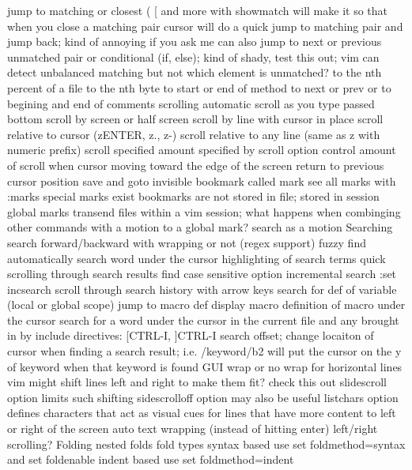 \documentclass[12pt]{book}
\begin{document}
      jump to matching or closest ( { [ and more with %
        showmatch will make it so that when you close a matching pair cursor will do a quick jump to matching pair and jump back; kind of annoying if you ask me
        can also jump to next or previous unmatched pair or conditional (if, else); kind of shady, test this out; vim can detect unbalanced matching but not which element is unmatched?
      to the nth percent of a file
      to the nth byte
      to start or end of method
      to next or prev { or }
      to begining and end of comments
    scrolling
      automatic scroll as you type passed bottom
      scroll by screen or half screen
      scroll by line with cursor in place
      scroll relative to cursor (zENTER, z., z-)
      scroll relative to any line (same as z with numeric prefix)
      scroll specified amount specified by scroll option
      control amount of scroll when cursor moving toward the edge of the screen
    return to previous cursor position
    save and goto invisible bookmark called mark
      see all marks with :marks
      special marks exist
      bookmarks are not stored in file; stored in session
      global marks transend files within a vim session; what happens when combinging other commands with a motion to a global mark?
    search as a motion
Searching
  search forward/backward with wrapping or not (regex support)
  fuzzy find
  automatically search word under the cursor
  highlighting of search terms
  quick scrolling through search results
  find
  case sensitive option
  incremental search :set incsearch
  scroll through search history with arrow keys
  search for def of variable (local or global scope)
  jump to macro def
  display macro definition of macro under the cursor
  search for a word under the cursor in the current file and any brought in by include directives: [CTRL-I, ]CTRL-I
  search offset; change locaiton of cursor when finding a search result; i.e. /keyword/b2 will put the cursor on the y of keyword when that keyword is found
GUI
  wrap or no wrap for horizontal lines
    vim might shift lines left and right to make them fit? check this out
    slidescroll option limits such shifting
    sidescrolloff option may also be useful
    listchars option defines characters that act as visual cues for lines that have more content to left or right of the screen
    auto text wrapping (instead of hitting enter)
  left/right scrolling?
  Folding
    nested folds
    fold types
      syntax based
        use set foldmethod=syntax and set foldenable
      indent based
        use set foldmethod=indent
}
\end{document}
